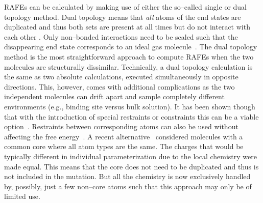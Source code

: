 \documentclass[journal=jctcce,manuscript=article]{achemso}
\begin{document}
RAFEs can be calculated by making use of either the so--called single or dual topology method.
Dual topology means that \emph{all} atoms of the end states are
duplicated and thus both sets are present at all
times but do not interact with each other \cite{doi:10.1021/j100056a020, doi:10.1021/jp981628n}.  Only non--bonded
interactions need to be scaled such that the disappearing end state
corresponds to an ideal gas molecule~\cite{doi:10.1021/jp981628n}.
The dual topology method is the most straightforward approach to compute RAFEs when the two molecules are structurally dissimilar.
Technically, a dual topology calculation is the same as two absolute calculations, executed simultaneously in opposite directions.
This, however, comes with additional complications as the two independent
molecules can drift apart and sample completely different environments (e.g., binding site versus bulk solution).
It has been shown though that with the introduction of
special restraints or constraints this can be a viable
option~\cite{doi:10.1021/ct700081t, rocklin_separated_2013, JCC:Axelsen-Li}.
Restraints between corresponding atoms can also be used without affecting the free
energy~\cite{JCC:Axelsen-Li}.  A recent
alternative~\cite{doi:10.1021/acs.jctc.5b00179} considered molecules with a
common core where all atom types are the same.  The charges that would be
typically different in individual parameterization due to the local chemistry
were made equal.  This means that the core does not need to be duplicated and
thus is not included in the mutation.  But all the chemistry is now exclusively
handled by, possibly, just a few non--core atoms such that this approach may
only be of limited use.
\end{document}
